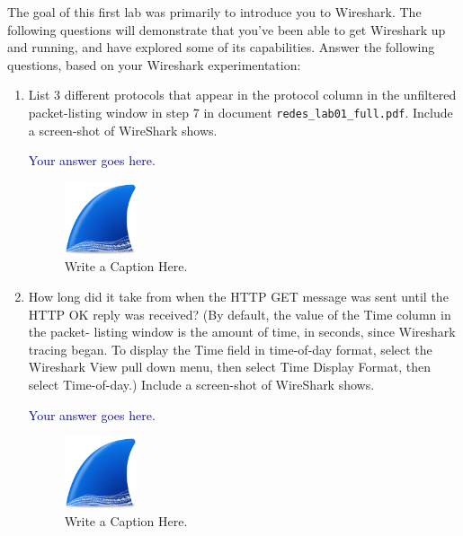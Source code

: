 \documentclass{article}
\begin{document}

\noindent
The goal of this first lab was primarily to introduce you to Wireshark. The following
questions will demonstrate that you’ve been able to get Wireshark up and running, and
have explored some of its capabilities. Answer the following questions, based on your
Wireshark experimentation:

\bigskip

\begin{enumerate}[1.]
\item List 3 different protocols that appear in the protocol column in the unfiltered
  packet-listing window in step 7 in document
  \texttt{re\-des\_\-lab01\_\-full.\-pdf}. Include a screen-shot of
  WireShark shows. \smallskip

    \textcolor{darkblue}{%
      Your answer goes here.
      }
    
      \medskip
      
\begin{figure}[h]
  \centering
  \includegraphics[width=0.2\textwidth]{./shark.png} 
  \caption{Write a Caption Here.}
  \label{fig:answer:1}
\end{figure}



  \item How long did it take from when the HTTP GET message was sent until the HTTP OK
    reply was received? (By default, the value of the Time column in the packet- listing
    window is the amount of time, in seconds, since Wireshark tracing began. To display
    the Time field in time-of-day format, select the Wireshark View pull down menu, then
    select Time Display Format, then select Time-of-day.) Include a screen-shot of
  WireShark shows. \smallskip

    \textcolor{darkblue}{%
      Your answer goes here.
      }
    
    \medskip 
      
\begin{figure}[h]
  \centering
  \includegraphics[width=0.2\textwidth]{./shark.png} 
  \caption{Write a Caption Here.}
  \label{fig:answer:2}
\end{figure}



\end{enumerate}
\end{document}
